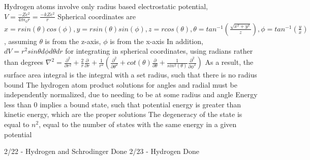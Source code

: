 \documentclass[11 pt, twoside]{article}
\newenvironment{outline*}
{
	\begin{outline}[enumerate]
	}
	{\end{outline}
}
\begin{document}
\begin{outline*}
\1 Hydrogen atoms involve only radius based electrostatic potential, $V = \frac{-Ze^2}{4\pi \epsilon_0 r} = \frac{-kZe^2}{r}$
	\2 Spherical coordinates are $x = rsin(\theta)cos(\phi), y = rsin(\theta)sin(\phi), z = rcos(\theta), \theta = tan^{-1}(\frac{\sqrt{x^2 + y^2}}{z}), \phi = tan^{-1}(\frac{y}{x})$, assuming $\theta$ is from the z-axis, $\phi$ is from the x-axis
		\3 In addition, $dV = r^2sin\theta d\phi d\theta dr$ for integrating in spherical coordinates, using radians rather than degrees
		\3 $\nabla^2 = \frac{\partial^2}{\partial r^2} + \frac{2}{r}\frac{\partial}{\partial r} + \frac{1}{r^2}(\frac{\partial^2}{\partial \theta^2} + cot(\theta)\frac{\partial}{\partial \theta} + \frac{1}{sin^2(\theta)}\frac{\partial^2}{\partial \phi^2})$
	\2 As a result, the surface area integral is the integral with a set radius, such that there is no radius bound
\1 The hydrogen atom product solutions for angles and radial must be independently normalized, due to needing to be at some radius and angle
	\2 Energy less than 0 implies a bound state, such that potential energy is greater than kinetic energy, which are the proper solutions
	\2 The degeneracy of the state is equal to $n^2$, equal to the number of states with the same energy in a given potential

2/22 - Hydrogen and Schrodinger Done
2/23 - Hydrogen Done
\end{outline*}
\end{document}
